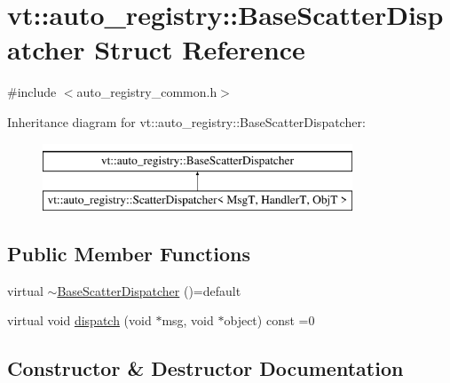 \hypertarget{structvt_1_1auto__registry_1_1_base_scatter_dispatcher}{}\section{vt\+:\+:auto\+\_\+registry\+:\+:Base\+Scatter\+Dispatcher Struct Reference}
\label{structvt_1_1auto__registry_1_1_base_scatter_dispatcher}


{\ttfamily \#include $<$auto\+\_\+registry\+\_\+common.\+h$>$}

Inheritance diagram for vt\+:\+:auto\+\_\+registry\+:\+:Base\+Scatter\+Dispatcher\+:\begin{figure}[H]
\begin{center}
\leavevmode
\includegraphics[height=2.000000cm]{structvt_1_1auto__registry_1_1_base_scatter_dispatcher}
\end{center}
\end{figure}
\subsection*{Public Member Functions}
\begin{DoxyCompactItemize}
\item 
virtual \hyperlink{structvt_1_1auto__registry_1_1_base_scatter_dispatcher_a9472bb7f39271247cea892d3b0d94612}{$\sim$\+Base\+Scatter\+Dispatcher} ()=default
\item 
virtual void \hyperlink{structvt_1_1auto__registry_1_1_base_scatter_dispatcher_af9efaf266a3a809bfeaba5269f1583b2}{dispatch} (void $\ast$msg, void $\ast$object) const =0
\end{DoxyCompactItemize}


\subsection{Constructor \& Destructor Documentation}
\mbox{\label{structvt_1_1auto__registry_1_1_base_scatter_dispatcher_a9472bb7f39271247cea892d3b0d94612}} 
